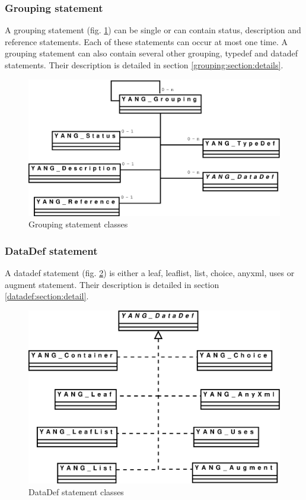 \documentclass[a4paper]{article}
\begin{document}
\subsubsection{Grouping statement}
\label{grouping:section:global}

A grouping statement (fig.  \ref{grouping})  can be single or can
contain status,  description and reference statements.   Each of these
statements can occur at most one time. A grouping statement can also
contain  several  other  grouping,  typedef and  datadef  statements.
Their       description       is       detailed      in       section
\ref{grouping:section:details}.
\begin{figure}[htbp]
\begin{center}
\includegraphics[scale = .3]{grouping.eps}
\end{center}
\caption{Grouping statement classes}
\label{grouping}
\end{figure}

\subsubsection{DataDef statement}
\label{datadef:section:global}

A datadef  statement (fig. \ref{datadef}) is either  a leaf, leaflist,
list, choice,  anyxml, uses or augment  statement. Their description is
detailed in section \ref{datadef:section:detail}.
\begin{figure}[htbp]
\begin{center}
\includegraphics[scale = .3]{datadef.eps}
\end{center}
\caption{DataDef statement classes}
\label{datadef}
\end{figure}
\end{document}

